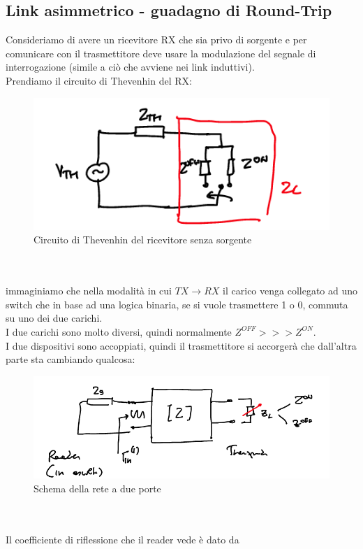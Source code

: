 \documentclass[oneside, 12pt]{extbook}
\begin{document}
\subsection{Link asimmetrico - guadagno di Round-Trip}
Consideriamo di avere un ricevitore RX che sia privo di sorgente e per comunicare con il trasmettitore deve usare la modulazione del segnale di interrogazione (simile a ciò che avviene nei link induttivi).\\Prendiamo il circuito di Thevenhin del RX:\\
\begin{figure}
	\includegraphics[scale=0.5]{immagini/thev_rx.png}
	\caption{Circuito di Thevenhin del ricevitore senza sorgente}
\end{figure}
\\\\immaginiamo che nella modalità in cui $TX \rightarrow RX$ il carico venga collegato ad uno switch che in base ad una logica binaria, se si vuole trasmettere 1 o 0, commuta su uno dei due carichi.\\I due carichi sono molto diversi, quindi normalmente $Z^{OFF} >>> Z^{ON}$.\\I due dispositivi sono accoppiati, quindi il trasmettitore si accorgerà che dall'altra parte sta cambiando qualcosa:\\
\begin{figure}
	\includegraphics[scale=0.5]{immagini/rete_dp_2.png}
	\caption{Schema della rete a due porte}
\end{figure}
\\\\Il coefficiente di riflessione che il reader vede è dato da
\end{document}
